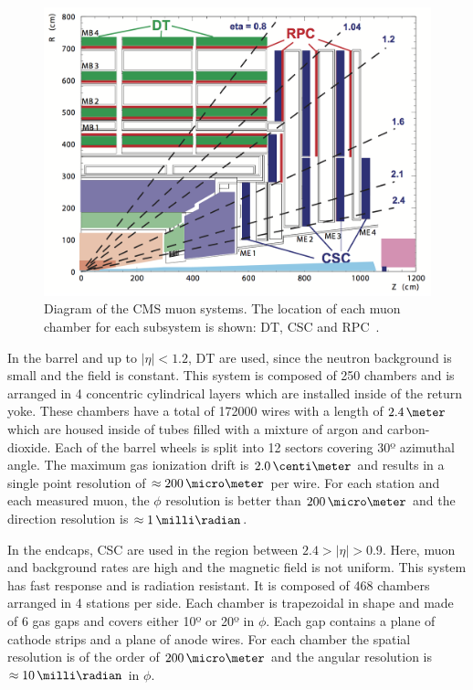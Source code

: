\begin{figure}[!htb]
  \centering
  \includegraphics{Chapter02/CMS/Images/CMS_Muon_Layout.png}
  \caption[Diagram of the CMS muon systems. The location of each muon chamber for each subsystem is shown: DT, CSC and RPC.]
  {Diagram of the \gls{CMS} muon systems. The location of each muon chamber for each subsystem is shown: \gls{DT}, \gls{CSC} and \gls{RPC}~\cite{CMSTDR:CMSPhysicsVol1}.}
  \label{FIGURE:ExperimentalApparatus_CMS_Muon_Layout}
\end{figure}

In the barrel and up to $|\eta|<1.2$, \acrfull{DT} are used, since the neutron background is small and the field is constant. This system is composed of 250 chambers and is arranged in 4 concentric cylindrical layers which are installed inside of the return yoke. These chambers have a total of 172000 wires with a length of $2.4\,\meter$ which are housed inside of tubes filled with a mixture of argon and carbon-dioxide. Each of the barrel wheels is split into 12 sectors covering 30º azimuthal angle. The maximum gas ionization drift is $2.0\,\centi\meter$ and results in a single point resolution of $\approx 200\,\micro\meter$ per wire. For each station and each measured muon, the $\phi$ resolution is better than $200\,\micro\meter$ and the direction resolution is $\approx 1\,\milli\radian$.

In the endcaps, \gls{CSC} are used in the region between $2.4>|\eta|>0.9$. Here, muon and background rates are high and the magnetic field is not uniform. This system has fast response and is radiation resistant. It is composed of 468 chambers arranged in 4 stations per side. Each chamber is trapezoidal in shape and made of 6 gas gaps and covers either 10º or 20º in $\phi$. Each gap contains a plane of cathode strips and a plane of anode wires. For each chamber the spatial resolution is of the order of $200\,\micro\meter$ and the angular resolution is $\approx 10\,\milli\radian$ in $\phi$.

